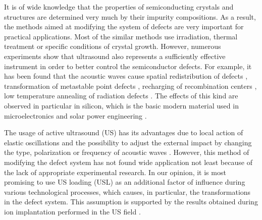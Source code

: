 \documentclass[%
 aip,jap,
 amsmath,amssymb,
 reprint,%
]{revtex4-1}
\begin{document}
It is of wide knowledge that the properties of semiconducting crystals and structures are determined very much by their impurity compositions.
As a result, the methods aimed at modifying the system of defects are very important for practical applications.
Most of the similar methods use irradiation, thermal treatment or specific conditions of crystal growth.
However, numerous experiments show that ultrasound also represents a sufficiently effective instrument in order to better control the semiconductor defects.
For example, it has been found that the acoustic waves cause
spatial redistribution of defects \cite{Roman:2010JAP,GORB2020,Ostapenko1999,Zaveryukhin2002,Zaver:2008,OstapSC},
transformation of metastable point defects \cite{buyanova1994,Ostrovskii2001,Wosinski},
recharging of recombination centers \cite{Olikh:Ultras,Korotchenkov1995},
low temperature annealing of radiation defects \cite{Podolian2012,YOlikh2006TPL,UST:OstrovCsI,Parchinskii2006,UST:LED_SM}.
The effects of this kind are observed in particular in silicon, which is the basic modern material used in microelectronics and solar power engineering \cite{Roman:2010JAP,GORB2020,Zaver:2008,Roman:2007APL,OlikhJAP,Ostrovskii2001,Podolian2012,Parchinskii2006}.

The usage of active ultrasound (US) has its advantages due to
local action of elastic oscillations
and the possibility to adjust the external impact by changing the type, polarization or frequency of acoustic waves \cite{Olikh2018JAP}.
However, this method of modifying the defect system has not found wide application not least because of the lack of appropriate experimental research.
In our opinion, it is most promising to use US loading (USL) as an additional factor of influence during various technological processes, which causes, in particular, the transformations in the defect system.
This assumption is supported by the results obtained during ion implantation performed in the US field \cite{Roman:2010JAP,Roman:2007APL,Roman:2006JAP}.
\end{document}
